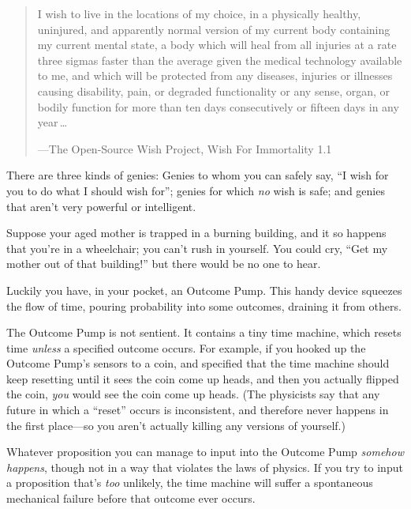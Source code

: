 {\myendsectiontext


\begin{quote}
{
 I wish to live in the locations of my choice, in a physically
healthy, uninjured, and apparently normal version of my current body
containing my current mental state, a body which will heal from all
injuries at a rate three sigmas faster than the average given the
medical technology available to me, and which will be protected from
any diseases, injuries or illnesses causing disability, pain, or
degraded functionality or any sense, organ, or bodily function for more
than ten days consecutively or fifteen days in any year\,\ldots}

{\raggedleft
 {}---The Open-Source Wish Project, Wish For Immortality 1.1
 \par}
\end{quote}



{
 There are three kinds of genies: Genies to whom you can safely
say, ``I wish for you to do what I should wish
for''; genies for which \textit{no} wish is safe; and
genies that aren't very powerful or intelligent.}

{
 Suppose your aged mother is trapped in a burning building, and it
so happens that you're in a wheelchair; you
can't rush in yourself. You could cry,
``Get my mother out of that
building!'' but there would be no one to hear.}

{
 Luckily you have, in your pocket, an Outcome Pump. This handy
device squeezes the flow of time, pouring probability into some
outcomes, draining it from others.}

{
 The Outcome Pump is not sentient. It contains a tiny time machine,
which resets time \textit{unless} a specified outcome occurs. For
example, if you hooked up the Outcome Pump's sensors to
a coin, and specified that the time machine should keep resetting until
it sees the coin come up heads, and then you actually flipped the coin,
\textit{you} would see the coin come up heads. (The physicists say that
any future in which a ``reset''
occurs is inconsistent, and therefore never happens in the first
place---so you aren't actually killing any versions of
yourself.)}

{
 Whatever proposition you can manage to input into the Outcome Pump
\textit{somehow happens}, though not in a way that violates the laws of
physics. If you try to input a proposition that's
\textit{too} unlikely, the time machine will suffer a spontaneous
mechanical failure before that outcome ever occurs.}

}
